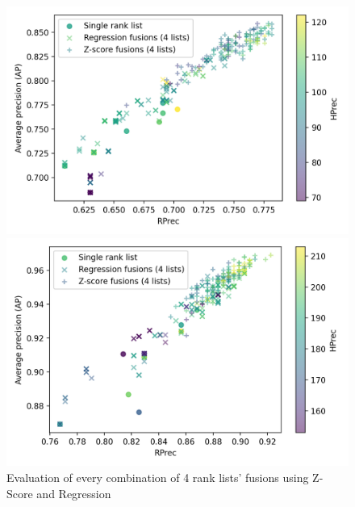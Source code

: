 \begin{figure}
  \centering
  \caption{Evaluation of every combination of 4 rank lists' fusions using Z-Score and Regression}
  \label{fig:fusions}

  \label{fig:fusion_evaluation_A}
  \includegraphics[width=\linewidth]{img/fusion_evaluation_A.png}

  \vspace{0.5cm}

  \label{fig:fusion_evaluation_B}
  \includegraphics[width=\linewidth]{img/fusion_evaluation_B.png}
\end{figure}

